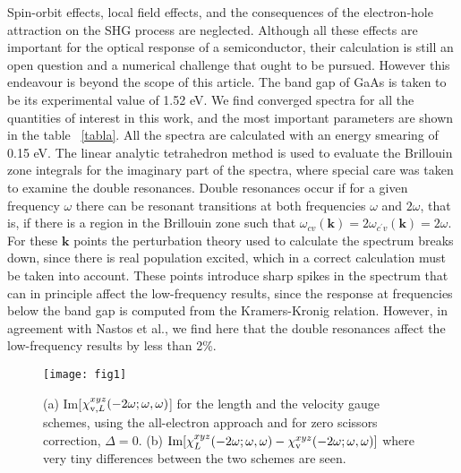 \documentclass[floatfix,prb,aps,superscriptaddress,11pt]{revtex4}
\begin{document}
Spin-orbit effects, local field effects, and the consequences of the
electron-hole attraction\cite{leitsmannPRB05} on the SHG process are
neglected. Although all these effects are important for the optical
response of a semiconductor, their calculation is still an open
question and a numerical challenge that ought to be pursued. However
this endeavour is
beyond the scope of this article.
The band gap of GaAs is taken to be its experimental value of
1.52 eV. We find converged spectra for all the quantities of interest in
this work, and the most important parameters are shown in the table 
~\ref{tabla}. All the spectra are calculated with an energy smearing of 0.15 eV.
The linear analytic tetrahedron method is used to evaluate the Brillouin
zone integrals for the imaginary part of the spectra, where special care was
taken to examine the double resonances.\cite{nastosPRB05} Double resonances
occur if for a given frequency $\omega$ there can be resonant transitions at
both frequencies $\omega$ and $2\omega$, that is, if there is a region in the
Brillouin zone such that $\omega_{cv}(\mathbf{k})=2\omega_{c^{\prime }v}(\mathbf{k})=2\omega$.
For these $\mathbf{k}$ points the perturbation theory used to calculate the
spectrum breaks down, since there is real population excited, which in a
correct calculation must be taken into account. These points introduce sharp
spikes in the spectrum that can in principle affect the low-frequency
results, since the response at frequencies below the band gap is computed
from the Kramers-Kronig relation. However, in agreement with 
Nastos et al.,\cite{nastosPRB05} we find here that the double
resonances affect the low-frequency results by less than 2\%.

\begin{figure}[t]
\texttt{[image: fig1]}
\caption{(a) Im[$\protect\chi
^{xyz}_{\mathrm{v},L}(-2\omega;\omega,\omega)$] for the length and the velocity gauge schemes, using
the all-electron approach and for zero scissors correction,
$\Delta=0$. 
(b)
$\mbox{Im}\lbrack
\protect\chi^{xyz}_{L}(-2\omega;\omega,\omega)-\protect\chi^{xyz}_{\mathrm{v}}(-2\omega;\omega,\omega)]$ 
where very tiny
differences between the two schemes are seen.
}
\label{fimd0}
\end{figure}
\end{document}
